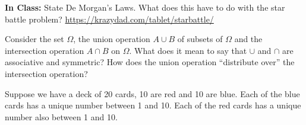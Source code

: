 \documentclass[addpoints,12pt]{exam}
\begin{document}
\begin{questions}
\addpoints

\question[2] \textbf{In Class:} State De Morgan's Laws. What does this have to do with the star battle problem? \url{https://krazydad.com/tablet/starbattle/}


\question[2] Consider the set $\Omega$, the union operation $A \cup B$ of subsets of $\Omega$ and the intersection operation $A \cap B$ on $\Omega$. What does it mean to say that $\cup$ and $\cap$ are associative and symmetric? How does the union operation ``distribute over'' the intersection operation?


\question[5] Suppose we have a deck of 20 cards, 10 are red and 10 are blue. Each of the blue cards has a unique number between 1 and 10. Each of the red cards has a unique number also between 1 and 10.

\noaddpoints
{}
\end{questions}
\end{document}
